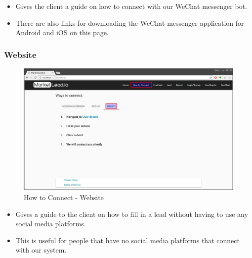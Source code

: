 \documentclass{article}
\begin{document}
				\begin{itemize}
					\item Gives the client a guide on how to connect with our WeChat messenger bot.
					\item There are also links for downloading the WeChat messenger application for Android and iOS on this page.
				\end{itemize}

			\subsubsection{Website}
				\begin{figure}[H]
					\includegraphics[width=\textwidth]{images/how_to_connect_website.jpg}
					\caption{How to Connect - Website}
					\label{fig:howToConnectWebsite}
				\end{figure}

				\begin{itemize}
					\item Gives a guide to the client on how to fill in a lead without having to use any social media platforms.
					\item This is useful for people that have no social media platforms that connect with our system.
				\end{itemize}
\end{document}
